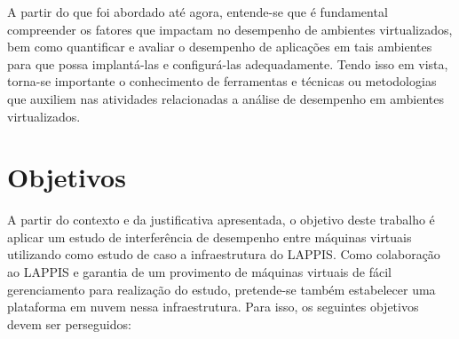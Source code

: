 
A partir do que foi abordado até agora, entende-se que é fundamental compreender os fatores que impactam no desempenho de ambientes virtualizados, bem como quantificar e avaliar o desempenho de aplicações em tais ambientes para que possa implantá-las e configurá-las adequadamente. Tendo isso em vista, torna-se importante o conhecimento de ferramentas e técnicas ou metodologias que auxiliem nas atividades relacionadas a análise de desempenho em ambientes virtualizados. 


\section{Objetivos}


A partir do contexto e da justificativa apresentada, o objetivo deste trabalho é aplicar um estudo de interferência de desempenho entre máquinas virtuais utilizando como estudo de caso a infraestrutura do LAPPIS\footnotemark[2].                                                      Como colaboração ao LAPPIS e garantia de um provimento de máquinas virtuais de fácil gerenciamento para realização do estudo, pretende-se também estabelecer uma plataforma em nuvem nessa infraestrutura. Para isso, os seguintes objetivos devem ser perseguidos: 

